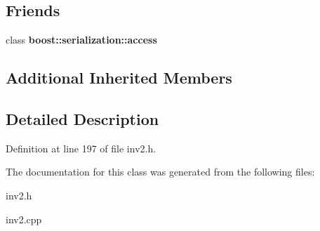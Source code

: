 \subsection*{Friends}
\begin{DoxyCompactItemize}
\item 
\hypertarget{class_boots_ac98d07dd8f7b70e16ccb9a01abf56b9c}{}\label{class_boots_ac98d07dd8f7b70e16ccb9a01abf56b9c} 
class {\bfseries boost\+::serialization\+::access}
\end{DoxyCompactItemize}
\subsection*{Additional Inherited Members}


\subsection{Detailed Description}


Definition at line 197 of file inv2.\+h.



The documentation for this class was generated from the following files\+:\begin{DoxyCompactItemize}
\item 
inv2.\+h\item 
inv2.\+cpp\end{DoxyCompactItemize}
